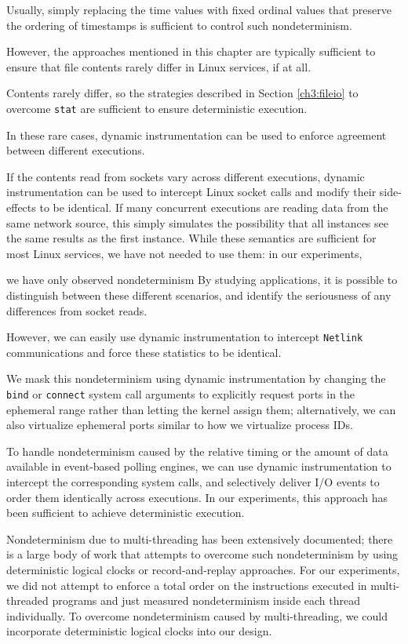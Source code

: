 Usually, simply
replacing the time values with fixed ordinal values
that preserve the ordering of timestamps is sufficient
to control such nondeterminism.

However,
the approaches mentioned in this chapter
are typically sufficient to ensure that
file contents rarely differ in Linux services,
if at all.

Contents rarely differ, so the strategies described in Section \ref{ch3:fileio} 
to overcome \texttt{stat} are sufficient to ensure deterministic execution. 

In these rare cases, dynamic instrumentation can be used
to enforce agreement between different executions.

If the contents read from sockets
vary across different executions, dynamic instrumentation can be used to 
intercept Linux socket calls
and modify their side-effects to be identical. If
many concurrent executions are reading data from the
same network source, this simply simulates the possibility that all instances
see the same results as the first instance. 
While these semantics are sufficient for most Linux services,
we have not needed to use them: in our experiments,

we have only observed nondeterminism
By studying applications, it is possible
to distinguish between 
these different scenarios, and
identify the seriousness
of any differences from socket reads.

However,
we can easily use dynamic instrumentation
to intercept \texttt{Netlink} communications
and force these statistics to be
identical.

We mask this nondeterminism 
using dynamic instrumentation by
changing the \texttt{bind} or \texttt{connect} 
system call arguments to explicitly request ports
in the ephemeral range rather than letting the kernel 
assign them; alternatively,
we can also virtualize ephemeral ports
similar to how we virtualize process IDs.

To handle nondeterminism caused by the relative
timing or the amount of data available 
in event-based polling engines, we 
can use dynamic instrumentation to intercept
the corresponding system calls, and
selectively deliver I/O events to order them
identically across executions. 
In our experiments, this approach has been sufficient to 
achieve deterministic execution.

Nondeterminism due to multi-threading
has been extensively documented; there
is a large body of work that
attempts to overcome such nondeterminism
by using deterministic logical clocks
or record-and-replay approaches. 
For our experiments, we did not attempt to enforce
a total order on the instructions executed in multi-threaded
programs and just measured nondeterminism inside each
thread individually. To
overcome nondeterminism caused
by multi-threading, we could incorporate
deterministic logical clocks 
into our design.


